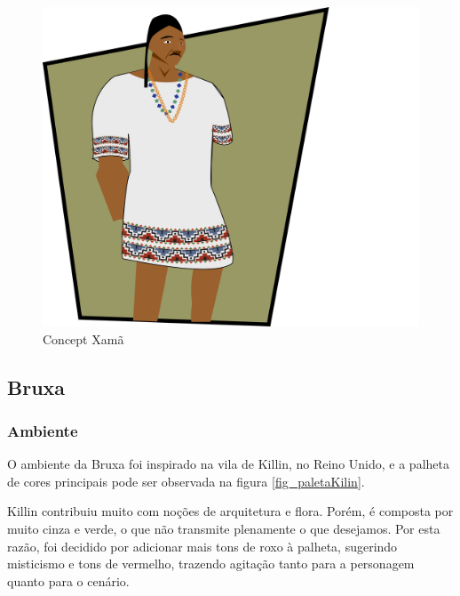 \clearpage

\begin{figure}[htb]
	\caption{\label{fig_conceptXama}Concept Xamã}
	\begin{center}
	    \includegraphics[width=\textwidth/2]{imagens/xama.png}
	\end{center}
\end{figure}




\subsection{Bruxa}
\subsubsection{Ambiente}
O ambiente da Bruxa foi inspirado na vila de Killin, no Reino Unido, e a palheta de cores principais pode ser observada na figura \ref{fig_paletaKilin}.

Killin contribuiu muito com noções de arquitetura e flora. Porém, é composta por muito cinza e verde, o que não transmite plenamente o que desejamos. Por esta razão, foi decidido por adicionar mais tons de roxo à palheta, sugerindo misticismo e tons de vermelho, trazendo agitação tanto para a personagem quanto para o cenário. 

\clearpage

